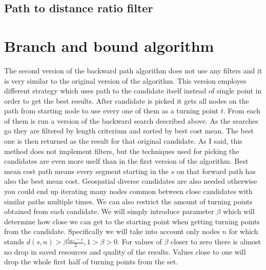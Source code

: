 \documentclass{ctuthesis}
\begin{document}
\subsection{Path to distance ratio filter}


\section{Branch and bound algorithm}
The second version of the backward path algorithm does not use any filters and it is very similar to the original version of the algorithm. This version employes different strategy which uses path to the candidate itself instead of single point in order to get the best results. After candidate is picked it gets all nodes on the path from starting node to use every one of them as a turning point \(t\). From each of them is run a version of the backward search described above. As the searches go they are filtered by length criterium and sorted by best cost mean. The best one is then returned as the result for that original candidate.
As I said, this method does not implement filters, but the techniques used for picking the candidates are even more uself than in the first version of the algorithm. Best mean cost path means every segment starting in the \(s\) on that forward path has also the best mean cost. Geospatial diverse candidates are also needed otherwise you could end up iterating many nodes common between close candidates with similar paths multiple times.
We can also restrict the amount of turning points obtained from each candidate. We will simply introduce parameter \(\beta\) which will determine how close we can get to the starting point when getting turning points from the candidate. Specifically we will take into account only nodes \(n\) for which stands \(d(s, n) > \beta\frac {l_{des}-\varepsilon} 2, 1 > \beta > 0\). For values of \(\beta\) closer to zero there is almost no drop in saved resources and quality of the results. Values close to one will drop the whole first half of turning points from the set. 
\end{document}
